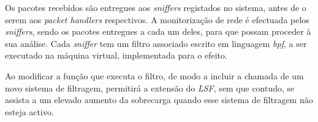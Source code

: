 Os pacotes recebidos são entregues aos \textit{sniffers} registados no sistema, antes de o serem aos \textit{packet handlers} respectivos.
A monitorização de rede é efectuada pelos \textit{sniffers}, sendo os pacotes entregues a cada um deles, para que possam proceder à sua análise.
Cada \textit{sniffer} tem um filtro associado escrito em linguagem \textit{bpf}, a ser executado na máquina virtual, implementada para o efeito.

Ao modificar a função que executa o filtro, de modo a incluir a chamada de um novo sistema de filtragem, permitirá a extensão do \textit{LSF}, sem que contudo, se assista a um elevado aumento da sobrecarga quando esse sistema de filtragem não esteja activo.






